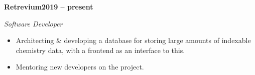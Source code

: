 \vspace{0.1cm}
\textbf{Retrevium\hfill 2019 -- present} \par
\textit{Software Developer} \par
\begin{itemize}
	\item Architecting \& developing a database for storing large amounts of indexable chemistry data, with a frontend as an interface to this.
	\item Mentoring new developers on the project. 
\end{itemize} \par